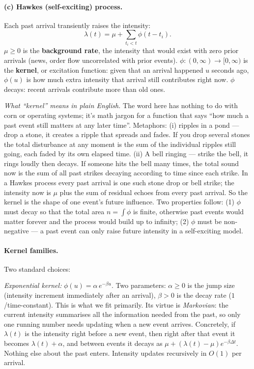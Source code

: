 \paragraph{(c) Hawkes (self-exciting) process.} Each past arrival transiently raises the intensity:
$$\lambda(t) = \mu + \sum_{t_i < t} \phi(t - t_i).$$
$\mu \geq 0$ is the \textbf{background rate}, the intensity that would exist with zero prior arrivals (news, order flow uncorrelated with prior events). $\phi:(0, \infty) \to [0, \infty)$ is the \textbf{kernel}, or excitation function: given that an arrival happened $u$ seconds ago, $\phi(u)$ is how much extra intensity that arrival still contributes right now. $\phi$ decays: recent arrivals contribute more than old ones.

\emph{What ``kernel'' means in plain English.} The word here has nothing to do with corn or operating systems; it's math jargon for a function that says ``how much a past event still matters at any later time''. Metaphors: (i) ripples in a pond --- drop a stone, it creates a ripple that spreads and fades. If you drop several stones the total disturbance at any moment is the sum of the individual ripples still going, each faded by its own elapsed time. (ii) A bell ringing --- strike the bell, it rings loudly then decays. If someone hits the bell many times, the total sound now is the sum of all past strikes decaying according to time since each strike. In a Hawkes process every past arrival is one such stone drop or bell strike; the intensity now is $\mu$ plus the sum of residual echoes from every past arrival. So the kernel is the shape of one event's future influence. Two properties follow: (1) $\phi$ must decay so that the total area $n = \int \phi$ is finite, otherwise past events would matter forever and the process would build up to infinity; (2) $\phi$ must be non-negative --- a past event can only raise future intensity in a self-exciting model.

\paragraph{Kernel families.} Two standard choices:

\emph{Exponential kernel:} $\phi(u) = \alpha\, e^{-\beta u}$. Two parameters: $\alpha \geq 0$ is the jump size (intensity increment immediately after an arrival), $\beta > 0$ is the decay rate ($1$/time-constant). This is what we fit primarily. Its virtue is \emph{Markovian}: the current intensity summarises all the information needed from the past, so only one running number needs updating when a new event arrives. Concretely, if $\lambda(t)$ is the intensity right before a new event, then right after that event it becomes $\lambda(t) + \alpha$, and between events it decays as $\mu + (\lambda(t) - \mu) e^{-\beta \Delta t}$. Nothing else about the past enters. Intensity updates recursively in $O(1)$ per arrival.

